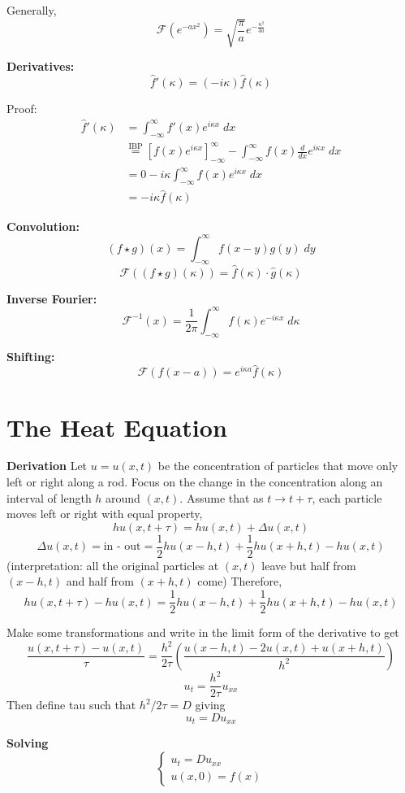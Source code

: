 \documentclass[12pt]{article}
\renewcommand{\hat}[1]{\widehat{#1}}
\newcommand{\F}[1]{\mathcal{F}(#1)}
\begin{document}
Generally,
\[\F{e^{-ax^2}} = \sqrt{\frac{\pi}{a}} e^{-\frac{\kappa^2}{4a}}\]

\textbf{Derivatives:}
\[\hat{f}'(\kappa) = (-i\kappa) \hat{f}(\kappa)\]

Proof:
\begin{align*}
    \hat{f}'(\kappa) &= \int_{-\infty}^{\infty} f'(x) e^{i\kappa x}\; dx\\
    &\overset{\text{IBP}}{=} \left[f(x)e^{i\kappa x}\right]_{-\infty}^\infty - \int_{-\infty}^{\infty} f(x) \frac{d}{dx}e^{i\kappa x}\; dx\\
    &= 0 - i\kappa \int_{-\infty}^{\infty} f(x) e^{i\kappa x}\; dx\\
    &= -i\kappa \hat{f}(\kappa)
\end{align*}

\textbf{Convolution:}
\[(f \star g)(x) = \int_{-\infty}^{\infty} f(x - y)g(y)\; dy\]
\[\F{(f \star g)(\kappa)} = \hat{f}(\kappa) \cdot \hat{g}(\kappa)\]

\textbf{Inverse Fourier:}
\[\mathcal{F}^{-1}(x) = \frac{1}{2\pi} \int_{-\infty}^{\infty} f(\kappa) e^{-i\kappa x}\; d\kappa\]

\textbf{Shifting:}
\[\F{f(x - a)} = e^{i\kappa a} \hat{f}(\kappa)\]

\section*{The Heat Equation}
\textbf{Derivation}
Let $u= u(x,t)$ be the concentration of particles that move only left or right along a rod. 
Focus on the change in the concentration along an interval of length $h$ around $(x, t)$.
Assume that as $t \to t + \tau$, each particle moves left or right with equal property, 
\[hu(x, t + \tau) = hu(x, t) + \Delta u(x, t)\]
\[\Delta u(x, t) = \text{in - out} = \frac{1}{2}hu(x - h, t) + \frac{1}{2}hu(x + h, t) - hu(x, t)\]
(interpretation: all the original particles at $(x, t)$ leave but half from $(x - h, t)$ and half from $(x + h, t)$ come)
Therefore, 
\[hu(x, t + \tau) - hu(x, t)= \frac{1}{2}hu(x - h, t) + \frac{1}{2}hu(x + h, t) - hu(x, t) \]

Make some transformations and write in the limit form of the derivative to get 
\[\frac{u(x, t + \tau) - u(x, t)}{\tau} = \frac{h^2}{2\tau}\left(\frac{u(x - h, t) - 2u(x, t) + u(x + h, t)}{h^2}\right)\]
\[u_t = \frac{h^2}{2\tau} u_{xx}\]
Then define tau such that $h^2/2\tau = D$ giving 
\[u_t = Du_{xx}\]

\textbf{Solving}
\[\begin{cases}
    u_t = Du_{xx}\\
    u(x, 0) = f(x)
\end{cases}\]
\end{document}
